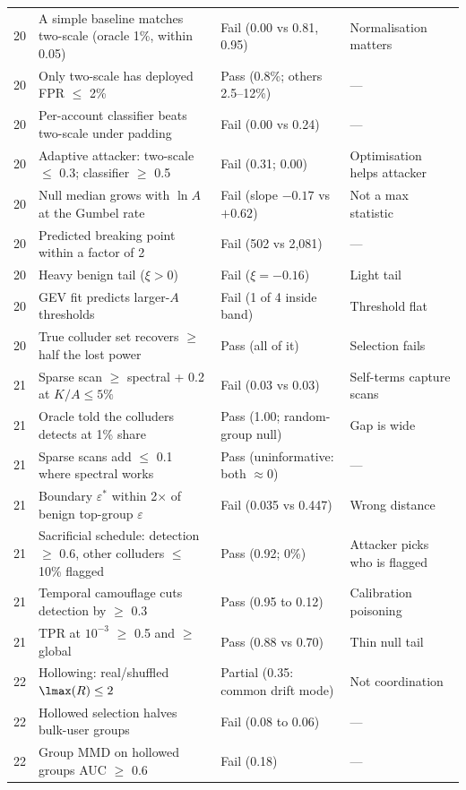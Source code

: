 \begin{longtable}{p{}p{}p{}p{}}
20 & A simple baseline matches two-scale (oracle 1\%, within 0.05) & Fail (0.00 vs 0.81, 0.95) & Normalisation matters \\
20 & Only two-scale has deployed FPR $\le$ 2\% & Pass (0.8\%; others 2.5--12\%) & --- \\
20 & Per-account classifier beats two-scale under padding & Fail (0.00 vs 0.24) & --- \\
20 & Adaptive attacker: two-scale $\le$ 0.3; classifier $\ge$ 0.5 & Fail (0.31; 0.00) & Optimisation helps attacker \\
20 & Null median grows with $\ln A$ at the Gumbel rate & Fail (slope $-0.17$ vs $+0.62$) & Not a max statistic \\
20 & Predicted breaking point within a factor of 2 & Fail (502 vs 2{,}081) & --- \\
20 & Heavy benign tail ($\xi>0$) & Fail ($\xi=-0.16$) & Light tail \\
20 & GEV fit predicts larger-$A$ thresholds & Fail (1 of 4 inside band) & Threshold flat \\
20 & True colluder set recovers $\ge$ half the lost power & Pass (all of it) & Selection fails \\
21 & Sparse scan $\ge$ spectral + 0.2 at $K/A\le 5\%$ & Fail (0.03 vs 0.03) & Self-terms capture scans \\
21 & Oracle told the colluders detects at 1\% share & Pass (1.00; random-group null) & Gap is wide \\
21 & Sparse scans add $\le$ 0.1 where spectral works & Pass (uninformative: both $\approx 0$) & --- \\
21 & Boundary $\varepsilon^*$ within 2$\times$ of benign top-group $\varepsilon$ & Fail (0.035 vs 0.447) & Wrong distance \\
21 & Sacrificial schedule: detection $\ge$ 0.6, other colluders $\le$ 10\% flagged & Pass (0.92; 0\%) & Attacker picks who is flagged \\
21 & Temporal camouflage cuts detection by $\ge$ 0.3 & Pass (0.95 to 0.12) & Calibration poisoning \\
21 & TPR at $10^{-3}$ $\ge$ 0.5 and $\ge$ global & Pass (0.88 vs 0.70) & Thin null tail \\
22 & Hollowing: real/shuffled $\lmax(R)\le 2$ & Partial (0.35: common drift mode) & Not coordination \\
22 & Hollowed selection halves bulk-user groups & Fail (0.08 to 0.06) & --- \\
22 & Group MMD on hollowed groups AUC $\ge$ 0.6 & Fail (0.18) & --- \\

\end{longtable}
